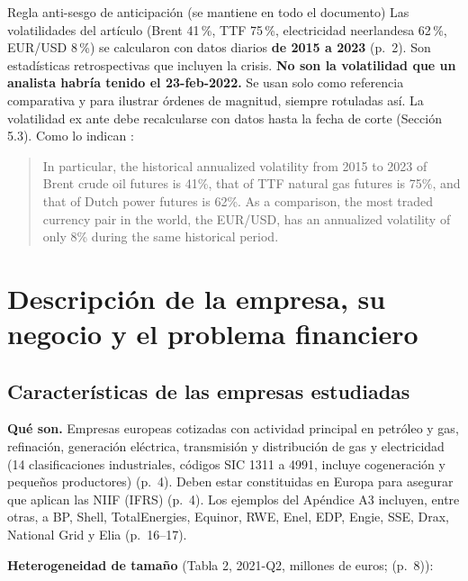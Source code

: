 \documentclass{article} %
\newcommand{\pg}[1]{(p.~#1)}
\begin{document}
    \begin{nota}{Regla anti-sesgo de anticipación (se mantiene en todo el documento)}
        Las volatilidades del artículo (Brent 41\,\%, TTF 75\,\%, electricidad neerlandesa 62\,\%, EUR/USD 8\,\%) se calcularon con datos diarios \textbf{de 2015 a 2023} \pg{2}. Son estadísticas retrospectivas que incluyen la crisis. \textbf{No son la volatilidad que un analista habría tenido el 23-feb-2022.} Se usan solo como referencia comparativa y para ilustrar órdenes de magnitud, siempre rotuladas así. La volatilidad ex ante debe recalcularse con datos hasta la fecha de corte (Sección 5.3).
        Como lo indican \textcite{GIANNOZZI2026107700}:
        \begin{quote}
            In particular, the historical annualized volatility from 2015 to 2023 of Brent crude oil futures is 41\%, that of TTF natural gas futures is 75\%, and that of Dutch power futures is 62\%. As a comparison, the most traded currency pair in the world, the EUR/USD, has an annualized volatility of only 8\% during the same historical period.\ \parencite{BARTRAM20199}
        \end{quote}
    \end{nota}

    \newpage

\section{Descripción de la empresa, su negocio y el problema financiero}

    \subsection{Características de las empresas estudiadas}

    \textbf{Qué son.} Empresas europeas cotizadas con actividad principal en petróleo y gas, refinación, generación eléctrica, transmisión y distribución de gas y electricidad 
    (14 clasificaciones industriales, códigos SIC 1311 a 4991, incluye cogeneración y pequeños productores) \pg{4}. 
    Deben estar constituidas en Europa para asegurar que aplican las NIIF (IFRS) \pg{4}. 
    Los ejemplos del Apéndice A3 incluyen, entre otras, a BP, Shell, TotalEnergies, Equinor, RWE, Enel, EDP, Engie, SSE, Drax, National Grid y Elia \pg{16--17}.

    \textbf{Heterogeneidad de tamaño} (Tabla 2, 2021-Q2, millones de euros; \pg{8}):
\end{document}
